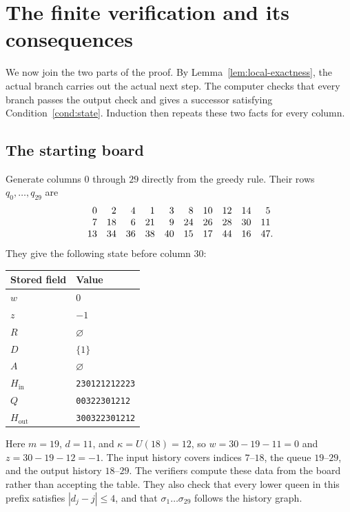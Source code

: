 \section{The finite verification and its consequences}\label{sec:finite}

We now join the two parts of the proof. By
Lemma~\ref{lem:local-exactness}, the actual branch carries out the
actual next step. The computer checks that
every branch passes the output check and gives a successor satisfying
Condition~\ref{cond:state}. Induction then repeats these two facts for
every column.

\subsection{The starting board}\label{app:seed}

Generate columns $0$ through $29$ directly from the greedy rule.
Their rows $q_0,\dots,q_{29}$ are
\[
\begin{array}{rrrrrrrrrr}
0&2&4&1&3&8&10&12&14&5\\
7&18&6&21&9&24&26&28&30&11\\
13&34&36&38&40&15&17&44&16&47\mathrlap{.}
\end{array}
\]
They give the following state before column $30$:
\begin{center}
\begin{tabular}{ll}
\toprule
Stored field&Value\\
\midrule
$w$&$0$\\
$z$&$-1$\\
$R$&$\varnothing$\\
$D$&$\{1\}$\\
$A$&$\varnothing$\\
$H_{\mathrm{in}}$&\texttt{230121212223}\\
$Q$&\texttt{00322301212}\\
$H_{\mathrm{out}}$&\texttt{300322301212}\\
\bottomrule
\end{tabular}
\end{center}
Here $m=19$, $d=11$, and $\kappa=U(18)=12$, so
$w=30-19-11=0$ and $z=30-19-12=-1$. The input history covers indices $7$--$18$, the
queue $19$--$29$, and the output history $18$--$29$. The verifiers
compute these data from the board rather than accepting the table.
They also check that every lower queen in this prefix satisfies
$|d_j-j|\le4$, and that $\sigma_1\dots\sigma_{29}$ follows the
history graph.

